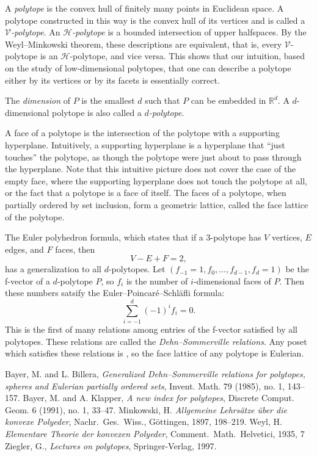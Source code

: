 \documentclass[12pt]{article}
\begin{document}
A \emph{polytope} is the convex hull of finitely many points in
Euclidean space.  A polytope constructed in this way is the convex
hull of its vertices and is called a \emph{$\mathcal{V}$-polytope}.
An \emph{$\mathcal{H}$-polytope} is a bounded intersection of
upper halfspaces.  By the Weyl--Minkowski theorem, these descriptions are
equivalent, that is, every $\mathcal{V}$-polytope is an
$\mathcal{H}$-polytope, and vice versa.  This shows that our
intuition, based on the study of low-dimensional polytopes, that one
can describe a polytope either by its vertices or by its facets is
essentially correct.

The \emph{dimension} of $P$ is the smallest $d$ such that $P$ can be
embedded in $\mathbb{R}^d$.  A $d$-dimensional polytope is also called
a \emph{$d$-polytope}.

A face of a polytope is the intersection of the polytope with a
supporting hyperplane.  Intuitively, a supporting hyperplane is a
hyperplane that ``just touches'' the polytope, as though the polytope
were just about to pass through the hyperplane.  Note that this
intuitive picture does not cover the case of the empty face, where the
supporting hyperplane does not touch the polytope at all, or the fact
that a polytope is a face of itself.  The faces of a polytope, when 
partially ordered by set inclusion, form a geometric lattice, called 
the face lattice of the polytope.

The Euler polyhedron formula, which states that if a $3$-polytope has
$V$ vertices, $E$ edges, and $F$ faces, then
\[
V - E + F = 2,
\]
has a generalization to all $d$-polytopes.  Let $(f_{-1}=1, f_0,
\dots, f_{d-1}, f_d = 1)$ be the f-vector of a $d$-polytope $P$, so
$f_i$ is the number of $i$-dimensional faces of $P$.  Then these numbers
satsify the Euler--Poincar\'e--Schl\"afli formula:
\begin{equation}
\sum_{i=-1}^d (-1)^i f_i = 0.
\end{equation}
This is the first of many relations among entries of the f-vector
satisfied by all polytopes.  These relations are called the
\emph{Dehn--Sommerville relations}.  Any poset which satisfies these
relations is ,
so the face lattice of any polytope is Eulerian.

\begin{thebibliography}{3}
Bayer, M. and L. Billera, \emph{Generalized Dehn--Sommerville relations for
polytopes, spheres and Eulerian partially ordered sets}, Invent. Math. 79
(1985), no. 1, 143--157.
Bayer, M. and A. Klapper, \emph{A new index for polytopes}, Discrete Comput.
Geom. 6
(1991), no. 1, 33--47.
Minkowski, H.  \emph{Allgemeine Lehrs\"atze \"uber die konvexe Polyeder}, Nachr.~Ges.~Wiss., G\"ottingen, 1897, 198--219.
Weyl, H.  \emph{Elementare Theorie der konvexen Polyeder}, Comment.~Math.~Helvetici, 1935, 7
Ziegler, G., \emph{Lectures on polytopes}, Springer-Verlag, 1997.
\end{thebibliography}
\end{document}
